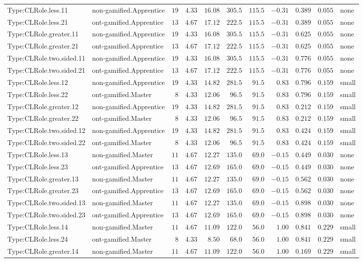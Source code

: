 \documentclass[6pt,a4paper]{article}
\begin{document}
{\begin{longtable}{llrrrrrrrrl}
Type:CLRole.less.11&non-gamified.Apprentice&$19$&$4.33$&$16.08$&$305.5$&$115.5$&$-0.31$&$0.389$&$0.055$&none\tabularnewline
Type:CLRole.less.21&ont-gamified.Apprentice&$13$&$4.67$&$17.12$&$222.5$&$115.5$&$-0.31$&$0.389$&$0.055$&none\tabularnewline
Type:CLRole.greater.11&non-gamified.Apprentice&$19$&$4.33$&$16.08$&$305.5$&$115.5$&$-0.31$&$0.625$&$0.055$&none\tabularnewline
Type:CLRole.greater.21&ont-gamified.Apprentice&$13$&$4.67$&$17.12$&$222.5$&$115.5$&$-0.31$&$0.625$&$0.055$&none\tabularnewline
Type:CLRole.two.sided.11&non-gamified.Apprentice&$19$&$4.33$&$16.08$&$305.5$&$115.5$&$-0.31$&$0.776$&$0.055$&none\tabularnewline
Type:CLRole.two.sided.21&ont-gamified.Apprentice&$13$&$4.67$&$17.12$&$222.5$&$115.5$&$-0.31$&$0.776$&$0.055$&none\tabularnewline
Type:CLRole.less.12&non-gamified.Apprentice&$19$&$4.33$&$14.82$&$281.5$&$ 91.5$&$ 0.83$&$0.796$&$0.159$&small\tabularnewline
Type:CLRole.less.22&ont-gamified.Master&$ 8$&$4.33$&$12.06$&$ 96.5$&$ 91.5$&$ 0.83$&$0.796$&$0.159$&small\tabularnewline
Type:CLRole.greater.12&non-gamified.Apprentice&$19$&$4.33$&$14.82$&$281.5$&$ 91.5$&$ 0.83$&$0.212$&$0.159$&small\tabularnewline
Type:CLRole.greater.22&ont-gamified.Master&$ 8$&$4.33$&$12.06$&$ 96.5$&$ 91.5$&$ 0.83$&$0.212$&$0.159$&small\tabularnewline
Type:CLRole.two.sided.12&non-gamified.Apprentice&$19$&$4.33$&$14.82$&$281.5$&$ 91.5$&$ 0.83$&$0.424$&$0.159$&small\tabularnewline
Type:CLRole.two.sided.22&ont-gamified.Master&$ 8$&$4.33$&$12.06$&$ 96.5$&$ 91.5$&$ 0.83$&$0.424$&$0.159$&small\tabularnewline
Type:CLRole.less.13&non-gamified.Master&$11$&$4.67$&$12.27$&$135.0$&$ 69.0$&$-0.15$&$0.449$&$0.030$&none\tabularnewline
Type:CLRole.less.23&ont-gamified.Apprentice&$13$&$4.67$&$12.69$&$165.0$&$ 69.0$&$-0.15$&$0.449$&$0.030$&none\tabularnewline
Type:CLRole.greater.13&non-gamified.Master&$11$&$4.67$&$12.27$&$135.0$&$ 69.0$&$-0.15$&$0.562$&$0.030$&none\tabularnewline
Type:CLRole.greater.23&ont-gamified.Apprentice&$13$&$4.67$&$12.69$&$165.0$&$ 69.0$&$-0.15$&$0.562$&$0.030$&none\tabularnewline
Type:CLRole.two.sided.13&non-gamified.Master&$11$&$4.67$&$12.27$&$135.0$&$ 69.0$&$-0.15$&$0.898$&$0.030$&none\tabularnewline
Type:CLRole.two.sided.23&ont-gamified.Apprentice&$13$&$4.67$&$12.69$&$165.0$&$ 69.0$&$-0.15$&$0.898$&$0.030$&none\tabularnewline
Type:CLRole.less.14&non-gamified.Master&$11$&$4.67$&$11.09$&$122.0$&$ 56.0$&$ 1.00$&$0.841$&$0.229$&small\tabularnewline
Type:CLRole.less.24&ont-gamified.Master&$ 8$&$4.33$&$ 8.50$&$ 68.0$&$ 56.0$&$ 1.00$&$0.841$&$0.229$&small\tabularnewline
Type:CLRole.greater.14&non-gamified.Master&$11$&$4.67$&$11.09$&$122.0$&$ 56.0$&$ 1.00$&$0.169$&$0.229$&small\tabularnewline

\end{longtable}}
\end{document}
